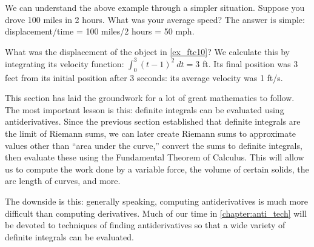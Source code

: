 We can understand the above example through a simpler situation. Suppose you drove 100 miles in 2 hours. What was your average speed? The answer is simple: displacement/time = 100 miles/2 hours = 50 mph.

What was the displacement of the object in \autoref{ex_ftc10}? We calculate this by integrating its velocity function: $\int_0^3 (t-1)^2\ dt = 3$ ft. Its final position was 3 feet from its initial position after 3 seconds: its average velocity was 1 ft/s.\bigskip

This section has laid the groundwork for a lot of great mathematics to follow. The most important lesson is this: definite integrals can be evaluated using antiderivatives. Since the previous section established that definite integrals are the limit of Riemann sums, we can later create Riemann sums to approximate values other than ``area under the curve,'' convert the sums to definite integrals, then evaluate these using the Fundamental Theorem of Calculus. This will allow us to compute the work done by a variable force, the volume of certain solids, the arc length of curves, and more.

The downside is this: generally speaking, computing antiderivatives is much more difficult than computing derivatives. Much of our time in \autoref{chapter:anti_tech} will be devoted to techniques of finding antiderivatives so that a wide variety of definite integrals can be evaluated.

